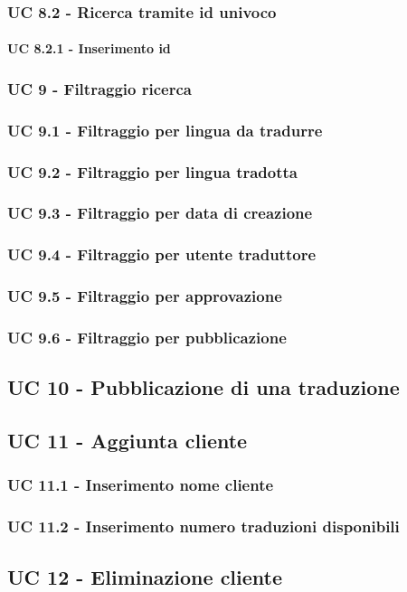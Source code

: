    \subsubsection{UC 8.2 - Ricerca tramite id univoco}
        \paragraph{UC 8.2.1 - Inserimento id}
\subsubsection{UC 9 - Filtraggio ricerca}
    \subsubsection{UC 9.1 - Filtraggio per lingua da tradurre}
    \subsubsection{UC 9.2 - Filtraggio per lingua tradotta}
    \subsubsection{UC 9.3 - Filtraggio per data di creazione}
    \subsubsection{UC 9.4 - Filtraggio per utente traduttore}
    \subsubsection{UC 9.5 - Filtraggio per approvazione}
    \subsubsection{UC 9.6 - Filtraggio per pubblicazione}
\subsection{UC 10 - Pubblicazione di una traduzione} %
\subsection{UC 11 - Aggiunta cliente}
    \subsubsection{UC 11.1 - Inserimento nome cliente}
    \subsubsection{UC 11.2 - Inserimento numero traduzioni disponibili}
\subsection{UC 12 - Eliminazione cliente}
